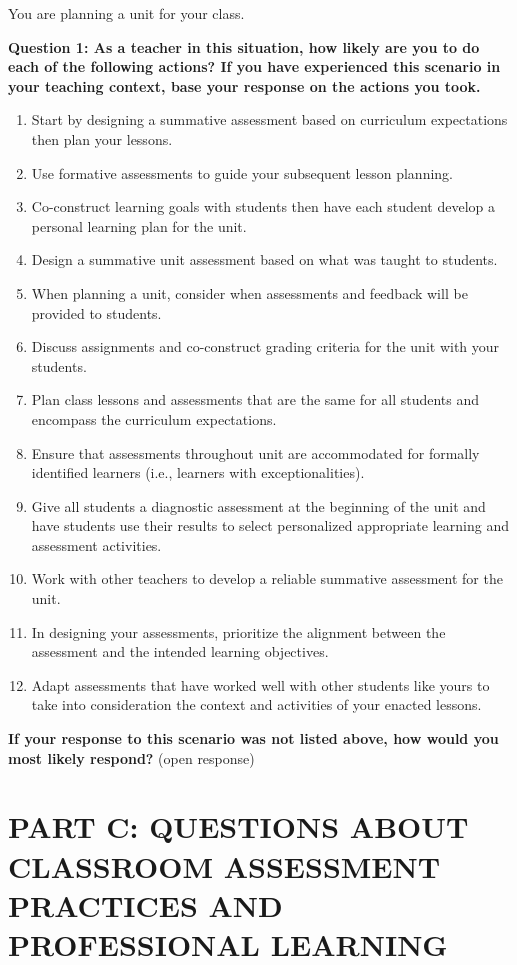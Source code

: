 \documentclass[
]{book}
\providecommand{\tightlist}{%
  \setlength{\itemsep}{0pt}\setlength{\parskip}{0pt}}
\begin{document}
You are planning a unit for your class.

\textbf{Question 1: As a teacher in this situation, how likely are you to do each of the following actions? If you have experienced this scenario in your teaching context, base your response on the actions you took.}

\begin{enumerate}
\def\labelenumi{\arabic{enumi}.}
\tightlist
\item
  Start by designing a summative assessment based on curriculum expectations then plan your lessons.
\item
  Use formative assessments to guide your subsequent lesson planning.
\item
  Co-construct learning goals with students then have each student develop a personal learning plan for the unit.
\item
  Design a summative unit assessment based on what was taught to students.
\item
  When planning a unit, consider when assessments and feedback will be provided to students.
\item
  Discuss assignments and co-construct grading criteria for the unit with your students.
\item
  Plan class lessons and assessments that are the same for all students and encompass the curriculum expectations.
\item
  Ensure that assessments throughout unit are accommodated for formally identified learners (i.e., learners with exceptionalities).
\item
  Give all students a diagnostic assessment at the beginning of the unit and have students use their results to select personalized appropriate learning and assessment activities.
\item
  Work with other teachers to develop a reliable summative assessment for the unit.
\item
  In designing your assessments, prioritize the alignment between the assessment and the intended learning objectives.
\item
  Adapt assessments that have worked well with other students like yours to take into consideration the context and activities of your enacted lessons.
\end{enumerate}

\textbf{If your response to this scenario was not listed above, how would you most likely respond?} (open response)

\hypertarget{part-c-questions-about-classroom-assessment-practices-and-professional-learning-1}{%
\section{PART C: QUESTIONS ABOUT CLASSROOM ASSESSMENT PRACTICES AND PROFESSIONAL LEARNING}\label{part-c-questions-about-classroom-assessment-practices-and-professional-learning-1}}
\end{document}
